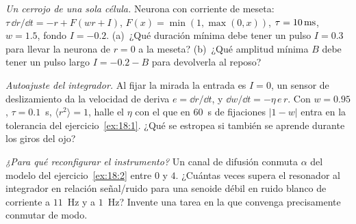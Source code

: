 \begin{exercise}[\lvlB]
\label{ex:18:5}
\emph{Un cerrojo de una sola célula.} Neurona con corriente de meseta: $\tau\,\dd r/\dd t=-r+F(wr+I)$, $F(x)=\min(1,\max(0,x))$, $\tau=10\,\text{ms}$, $w=1.5$, fondo $I=-0.2$. (a)~¿Qué duración mínima debe tener un pulso $I=0.3$ para llevar la neurona de $r=0$ a la meseta? (b)~¿Qué amplitud mínima $B$ debe tener un pulso largo $I=-0.2-B$ para devolverla al reposo?
\end{exercise}

\begin{exercise}[\lvlB]
\label{ex:18:6}
\emph{Autoajuste del integrador.} Al fijar la mirada la entrada es $I=0$, un sensor de deslizamiento da la velocidad de deriva $e=\dd r/\dd t$, y $\dd w/\dd t=-\eta\,e\,r$. Con $w=0.95$, $\tau=0.1$~s, $\langle r^2\rangle=1$, halle el $\eta$ con el que en $60$~s de fijaciones $|1-w|$ entra en la tolerancia del ejercicio~\ref{ex:18:1}. ¿Qué se estropea si también se aprende durante los giros del ojo?
\end{exercise}

\begin{exercise}[\lvlC]
\label{ex:18:7}
\emph{¿Para qué reconfigurar el instrumento?} Un canal de difusión conmuta $\alpha$ del modelo del ejercicio~\ref{ex:18:2} entre $0$ y $4$. ¿Cuántas veces supera el resonador al integrador en relación señal/ruido para una senoide débil en ruido blanco de corriente a $11$~Hz y a $1$~Hz? Invente una tarea en la que convenga precisamente conmutar de modo.
\end{exercise}
